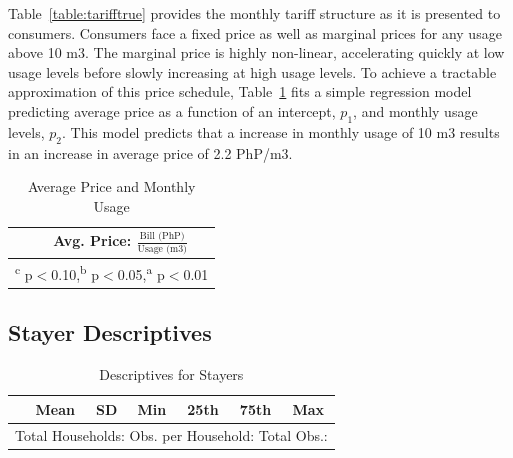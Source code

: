 \documentclass[12pt]{article}
\begin{document}
Table~\ref{table:tarifftrue} provides the monthly tariff structure as it is presented to consumers.  Consumers face a fixed price as well as marginal prices for any usage above 10 m3.  The marginal price is highly non-linear, accelerating quickly at low usage levels before slowly increasing at high usage levels.  To achieve a tractable approximation of this price schedule, Table~\ref{table:tcd_predict} fits a simple regression model predicting average price as a function of an intercept, $p_1$, and monthly usage levels, $p_2$.  This model predicts that a increase in monthly usage of 10 m3 results in an increase in average price of 2.2 PhP/m3.  

\begin{table}[H]
\small
\centering
\caption{Average Price and Monthly Usage}\label{table:tcd_predict}
\vspace{-2mm}
\begin{tabular}{lc}
\toprule
& \small Avg. Price: $\frac{\text{Bill (PhP)}}{\text{Usage (m3)}}$    \\
\midrule 

\bottomrule
\multicolumn{2}{l}{\scriptsize \textsuperscript{c} p$<$0.10,\textsuperscript{b} p$<$0.05,\textsuperscript{a} p$<$0.01 }
\end{tabular}
\end{table}



\subsection{Stayer Descriptives}


\begin{table}[H]
\centering
\caption{Descriptives for Stayers}\label{table:descriptives_stayers}
\vspace{-2mm}
\begin{tabular}{l*{1}{cccccc}}
\toprule
 & Mean & SD & Min & 25th & 75th & Max  \\
\midrule

\bottomrule
\multicolumn{7}{c}{Total Households:   Obs. per Household:  Total Obs.: }
\end{tabular}
\end{table}
\end{document}
